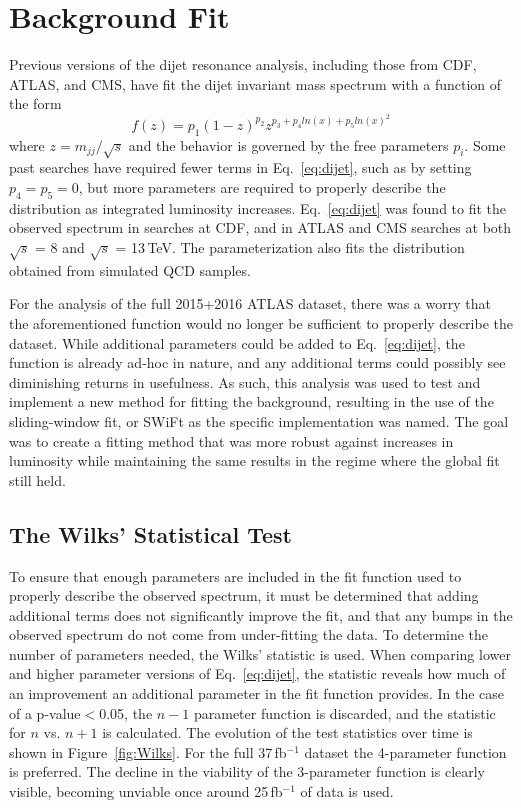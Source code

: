 \section{Background Fit}
Previous versions of the dijet resonance analysis, including those from CDF, ATLAS, and CMS, have fit the dijet invariant mass spectrum with a function of the form
\begin{equation}
f(z) = p_1(1-z)^{p_2}z^{p_3+p_4 ln(x)+p_5 ln(x)^2}
\label{eq:dijet}
\end{equation}
where $z = m_{jj}/\sqrt{s}$ and the behavior is governed by the free parameters $p_i$.  Some past searches have required fewer terms in Eq.~\ref{eq:dijet}, such as by setting $p_4 = p_5 = 0$, but more parameters are required to properly describe the distribution as integrated luminosity increases.  Eq.~\ref{eq:dijet} was found to fit the observed spectrum in searches at CDF, and in ATLAS and CMS searches at both $\sqrt{s}$ = 8 and $\sqrt{s}$ = 13\,TeV.  The parameterization also fits the distribution obtained from simulated QCD samples.

For the analysis of the full 2015+2016 ATLAS dataset, there was a worry that the aforementioned function would no longer be sufficient to properly describe the dataset.  While additional parameters could be added to Eq.~\ref{eq:dijet}, the function is already ad-hoc in nature, and any additional terms could possibly see diminishing returns in usefulness.  As such, this analysis was used to test and implement a new method for fitting the background, resulting in the use of the sliding-window fit, or SWiFt as the specific implementation was named.  The goal was to create a fitting method that was more robust against increases in luminosity while maintaining the same results in the regime where the global fit still held.

\subsection{The Wilks' Statistical Test}

To ensure that enough parameters are included in the fit function used to properly describe the observed spectrum, it must be determined that adding additional terms does not significantly improve the fit, and that any bumps in the observed spectrum do not come from under-fitting the data.  To determine the number of parameters needed, the Wilks' statistic is used.  When comparing lower and higher parameter versions of Eq.~\ref{eq:dijet}, the statistic reveals how much of an improvement an additional parameter in the fit function provides.  In the case of a p-value$<$0.05, the $n-1$ parameter function is discarded, and the statistic for $n$ vs. $n+1$ is calculated.  The evolution of the test statistics over time is shown in Figure~\ref{fig:Wilks}.  For the full 37\,fb$^{-1}$ dataset the 4-parameter function is preferred.  The decline in the viability of the 3-parameter function is clearly visible, becoming unviable once around 25\,fb$^{-1}$ of data is used.


